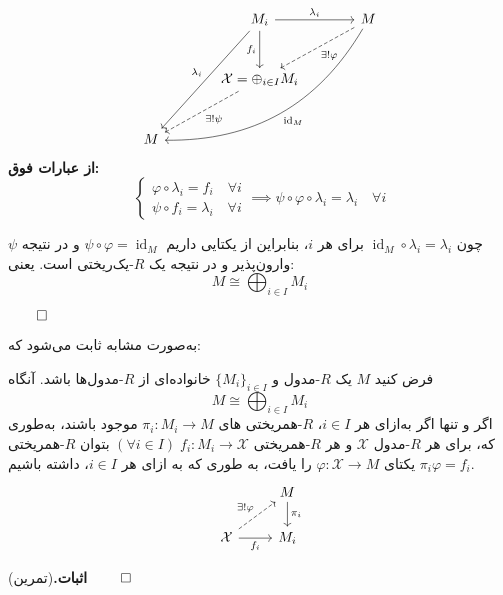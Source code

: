 \begin{frame}

    {
        \large
        \[
            \begin{tikzcd}[column sep=large, row sep=large, ampersand replacement=\&]
                \& M_i \arrow[r, "\lambda_i"] \arrow[ddl, "\lambda_i" swap] \arrow[d, "f_i" swap] \& M \arrow[dashed, dl, "\exists !\varphi"] \arrow[ddll, "\operatorname{id}_M" , bend left]\\
                \& \mathcal{X} = \oplus_{i \in I} M_i \arrow[dashed, dl, "\exists !\psi"]\& \\
                M \& \&
            \end{tikzcd}
        \]
    }
    \textbf{از عبارات فوق:}
    \[
        \begin{cases}
            \varphi \circ \lambda_i = f_i \quad \forall i \\
            \psi \circ f_i = \lambda_i \quad \forall i
        \end{cases}
        \implies \psi \circ \varphi \circ \lambda_i = \lambda_i \quad \forall i
    \]

    چون $\operatorname{id}_M \circ \lambda_i = \lambda_i$ برای هر $i$، بنابراین از یکتایی داریم $\psi \circ \varphi = \operatorname{id}_M$ و در نتیجه
    \(\psi\)
    وارون‌پذیر و در نتیجه یک
    $R$-یک‌ریختی است. یعنی:
    \[
        M \cong \bigoplus_{i \in I} M_i
    \]

    \hfill\(\qed\)

\end{frame}


\begin{frame}
    به‌صورت مشابه ثابت می‌شود که:
    \begin{theorem}
        فرض کنید $M$ یک $R$-مدول و $\{M_i\}_{i \in I}$ خانواده‌ای از $R$-مدول‌ها باشد. آنگاه
        \[
            M \cong \bigoplus_{i \in I} M_i
        \]
        اگر و تنها اگر
        به‌ازای هر
        \(i\in I\)،
        {\(R\)-همریختی }های
        \(\pi_i : M_i \to M\)
        موجود باشند، به‌طوری که، برای هر
        {\(R\)-مدول }
        \(\mathcal{X}\)
        و هر
        {\(R\)-همریختی }
        \((\forall i\in I) \; f_i : M_i \to \mathcal{X}\)
        بتوان
        {\(R\)-همریختی }
        یکتای
        \(\varphi: \mathcal{X} \to M\)
        را یافت، به طوری که به ازای هر
        \(i\in I\)،
        داشته باشیم
        \(\pi_i\varphi=f_i\).
            {
                \large
                \[
                    \begin{tikzcd}[ampersand replacement=\&]
                        \&  M \arrow{d}{\pi_i}\\
                        \mathcal{X} \arrow[dashed]{ur}{\exists! \varphi} \arrow[swap]{r}{f_i} \&  M_i
                    \end{tikzcd}
                \]
            }
    \end{theorem}

    \textbf{اثبات.}(تمرین)
    \hfill \(\qed\)
\end{frame}

